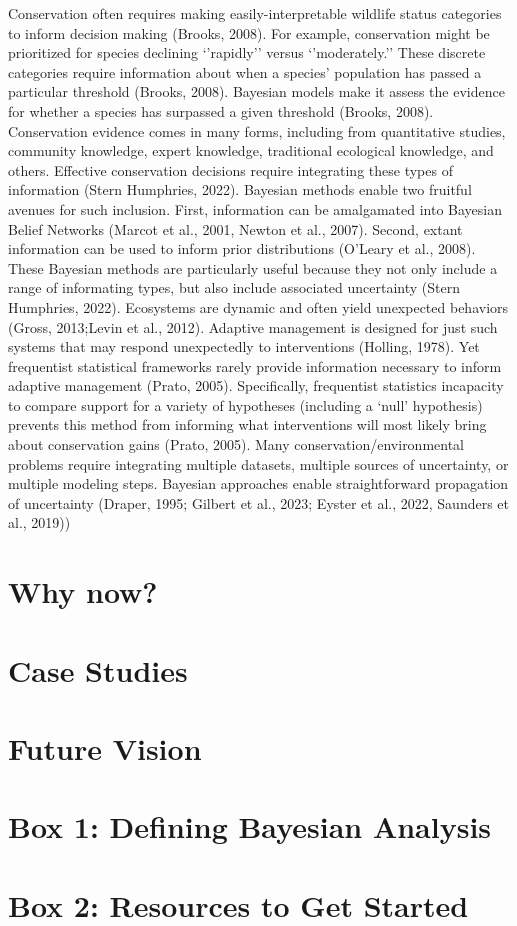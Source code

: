\documentclass{article}
\begin{document}
Conservation often requires making easily-interpretable wildlife status categories to inform decision making (Brooks, 2008). For example, conservation might be prioritized for species declining ‘’rapidly’’ versus ‘’moderately.’’ These discrete categories require information about when a species’ population has passed a particular threshold (Brooks, 2008).  Bayesian models make it assess the evidence for whether a species has surpassed a given threshold (Brooks, 2008). 
Conservation evidence comes in many forms, including from quantitative studies, community knowledge, expert knowledge, traditional ecological knowledge, and others. Effective conservation decisions require integrating these types of information (Stern Humphries, 2022). Bayesian methods enable two fruitful avenues for such inclusion. First, information can be amalgamated into Bayesian Belief Networks (Marcot et al., 2001, Newton et al., 2007). Second, extant information can be used to inform prior distributions (O’Leary et al., 2008). These Bayesian methods are particularly useful because they not only include a range of informating types, but also include associated uncertainty (Stern Humphries, 2022). 
Ecosystems are dynamic and often yield unexpected behaviors (Gross, 2013;Levin et al., 2012). Adaptive management is designed for just such systems that may respond unexpectedly to interventions (Holling, 1978). Yet frequentist statistical frameworks rarely provide information necessary to inform adaptive management  (Prato, 2005).  Specifically, frequentist statistics incapacity to compare support for a variety of hypotheses (including a ‘null’ hypothesis) prevents this method from informing what interventions will most likely bring about conservation gains (Prato, 2005). 
Many conservation/environmental problems require integrating multiple datasets, multiple sources of uncertainty, or multiple modeling steps.  Bayesian approaches enable straightforward propagation of  uncertainty (Draper, 1995; Gilbert et al., 2023; Eyster et al., 2022, Saunders et al., 2019)) 


\section* {Why now?}
\section* {Case Studies}

\section* {Future Vision}
\section* {Box 1: Defining Bayesian Analysis}
\section* {Box 2: Resources to Get Started}

\end{document}
